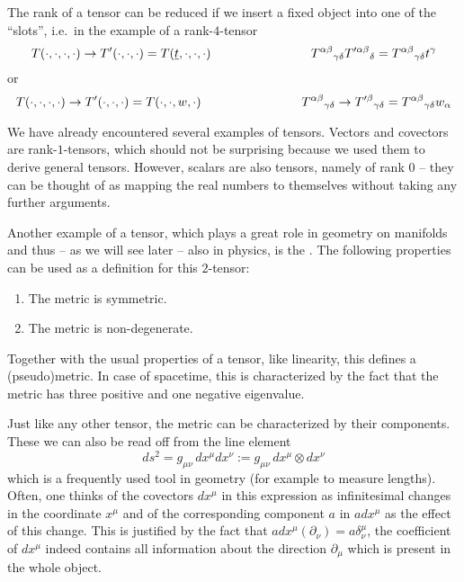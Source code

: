 The rank of a tensor can be reduced if we insert a fixed object into one of the \enquote{slots}, i.e.~in the example of a rank-$4$-tensor
\begin{equation}
T(\cdot, \cdot, \cdot, \cdot) \rightarrow T'(\cdot, \cdot, \cdot) = T(\underline{t}, \cdot, \cdot, \cdot) \qquad \qquad \qquad \qquad T^{\alpha \beta}{}_{\gamma \delta} T'^{\alpha \beta}{}_{\delta} = T^{\alpha \beta}{}_{\gamma \delta} t^\gamma
\end{equation}
or
\begin{equation}
T(\cdot, \cdot, \cdot, \cdot) \rightarrow T'(\cdot, \cdot, \cdot) = T(\cdot, \cdot, w, \cdot)
\qquad \qquad \qquad \qquad
T^{\alpha \beta}{}_{\gamma \delta} \rightarrow T'^{\beta}{}_{\gamma \delta} = T^{\alpha \beta}{}_{\gamma \delta} w_\alpha
\end{equation}



\begin{ex}
We have already encountered several examples of tensors. Vectors and covectors are rank-$1$-tensors, which should not be surprising because we used them to derive general tensors. However, scalars are also tensors, namely of rank $0$ -- they can be thought of as mapping the real numbers to themselves without taking any further arguments.
\end{ex}


Another example of a tensor, which plays a great role in geometry on manifolds and thus -- as we will see later -- also in physics, is the . The following properties can be used as a definition for this $2$-tensor:
\begin{enumerate}[(1.)]
\item The metric is symmetric.


\item The metric is non-degenerate.
\end{enumerate}
Together with the usual properties of a tensor, like linearity, this defines a (pseudo)metric. In case of spacetime, this is characterized by the fact that the metric has three positive and one negative eigenvalue.

Just like any other tensor, the metric can be characterized by their components. These we can also be read off from the line element
\begin{equation}
ds^2 = g_{\mu \nu} \, dx^\mu dx^\nu := g_{\mu \nu} \, dx^\mu \otimes dx^\nu
\end{equation}
which is a frequently used tool in geometry (for example to measure lengths). Often, one thinks of the covectors $dx^\mu$ in this expression as infinitesimal changes in the coordinate $x^\mu$ and of the corresponding component $a$ in $a dx^\mu$ as the effect of this change. This is justified by the fact that $a dx^\mu(\partial_\nu) = a \delta^\mu_\nu$, the coefficient of $dx^\mu$ indeed contains all information about the direction $\partial_\mu$ which is present in the whole object.



